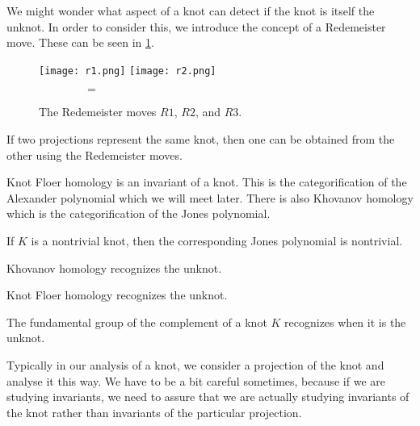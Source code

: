 \documentclass{amsproc}
\begin{document}
We might wonder what aspect of a knot can detect if the knot is itself the unknot. 
In order to consider this, we introduce the concept of a Redemeister move.
These can be seen in \cref{fig:redemeister}.

\begin{figure}
\centering
\texttt{[image: r1.png]}
\texttt{[image: r2.png]}\\
$\qquad\qquad=\qquad\qquad$
\caption{The Redemeister moves $R1$, $R2$, and $R3$.}
\label{fig:redemeister}
\end{figure}

\begin{thm}
If two projections represent the same knot, then one can be obtained from the other
using the Redemeister moves.
\end{thm}

Knot Floer homology is an invariant of a knot. 
This is the categorification of the Alexander polynomial which we will meet later. 
There is also Khovanov homology which is the categorification of the Jones polynomial.

\begin{con}
If $K$ is a nontrivial knot, then the corresponding Jones polynomial is nontrivial.
\end{con}

\begin{thm}
Khovanov homology recognizes the unknot.
\end{thm}

\begin{thm}
Knot Floer homology recognizes the unknot.
\end{thm}

\begin{thm}
The fundamental group of the complement of a knot $K$ recognizes when it is the unknot.
\end{thm}

\begin{wrn}
Typically in our analysis of a knot, we consider a projection of the knot and 
analyse it this way. We have to be a bit careful sometimes, because if we are studying invariants, 
we need to assure that we are actually studying invariants of the knot rather than
invariants of the particular projection.
\end{wrn}
\end{document}
